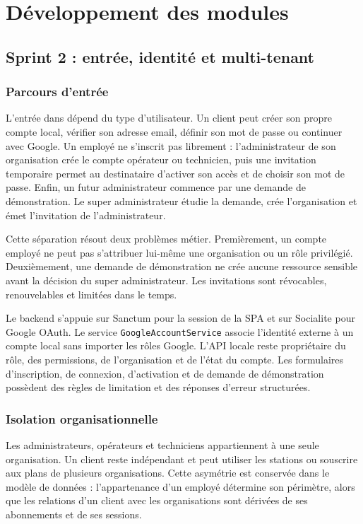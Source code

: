 \section{Développement des modules}

\subsection{Sprint 2 : entrée, identité et multi-tenant}

\subsubsection{Parcours d'entrée}

L'entrée dans \ProjectName{} dépend du type d'utilisateur. Un client peut créer
son propre compte local, vérifier son adresse email, définir son mot de passe ou
continuer avec Google. Un employé ne s'inscrit pas librement : l'administrateur de
son organisation crée le compte opérateur ou technicien, puis une invitation
temporaire permet au destinataire d'activer son accès et de choisir son mot de
passe. Enfin, un futur administrateur commence par une demande de démonstration.
Le super administrateur étudie la demande, crée l'organisation et émet
l'invitation de l'administrateur.

Cette séparation résout deux problèmes métier. Premièrement, un compte employé ne
peut pas s'attribuer lui-même une organisation ou un rôle privilégié.
Deuxièmement, une demande de démonstration ne crée aucune ressource sensible avant
la décision du super administrateur. Les invitations sont révocables, renouvelables
et limitées dans le temps.

Le backend s'appuie sur Sanctum pour la session de la SPA et sur Socialite pour
Google OAuth. Le service \texttt{GoogleAccountService} associe l'identité externe
à un compte local sans importer les rôles Google. L'API locale reste propriétaire
du rôle, des permissions, de l'organisation et de l'état du compte. Les formulaires
d'inscription, de connexion, d'activation et de demande de démonstration possèdent
des règles de limitation et des réponses d'erreur structurées.

\subsubsection{Isolation organisationnelle}

Les administrateurs, opérateurs et techniciens appartiennent à une seule
organisation. Un client reste indépendant et peut utiliser les stations ou
souscrire aux plans de plusieurs organisations. Cette asymétrie est conservée
dans le modèle de données : l'appartenance d'un employé détermine son périmètre,
alors que les relations d'un client avec les organisations sont dérivées de ses
abonnements et de ses sessions.

